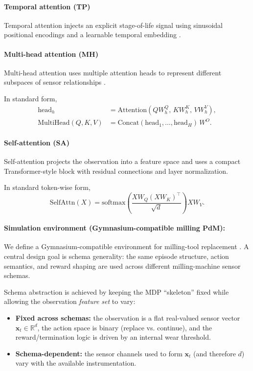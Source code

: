 \documentclass[sn-basic]{sn-jnl} %
\begin{document}
\paragraph{Temporal attention (TP)}
Temporal attention injects an explicit stage-of-life signal using sinusoidal positional encodings and a learnable temporal embedding \cite{Vaswani2017}.

\paragraph{Multi-head attention (MH)}
Multi-head attention uses multiple attention heads to represent different subspaces of sensor relationships \cite{Vaswani2017}.

In standard form,
\begin{align}
\mathrm{head}_h &= \mathrm{Attention}(QW_h^Q,\,KW_h^K,\,VW_h^V),\\
\mathrm{MultiHead}(Q,K,V) &= \mathrm{Concat}(\mathrm{head}_1,\ldots,\mathrm{head}_H)\,W^O.
\end{align}

\paragraph{Self-attention (SA)}
Self-attention projects the observation into a feature space and uses a compact Transformer-style block with residual connections and layer normalization.

In standard token-wise form,
\begin{equation}
\mathrm{SelfAttn}(X)=\mathrm{softmax}\left(\frac{XW_Q(XW_K)^\top}{\sqrt{d}}\right)XW_V.
\end{equation}

\paragraph{Simulation environment (Gymnasium-compatible milling PdM):}
We define a Gymnasium-compatible environment for milling-tool replacement \cite{Foundation2023}. A central design goal is schema generality: the same episode structure, action semantics, and reward shaping are used across different milling-machine sensor schemas.

Schema abstraction is achieved by keeping the MDP ``skeleton'' fixed while allowing the observation \emph{feature set} to vary:
\begin{itemize}
	\item \textbf{Fixed across schemas:} the observation is a flat real-valued sensor vector $\mathbf{x}_t\in\mathbb{R}^d$, the action space is binary (replace vs. continue), and the reward/termination logic is driven by an internal wear threshold.
	\item \textbf{Schema-dependent:} the sensor channels used to form $\mathbf{x}_t$ (and therefore $d$) vary with the available instrumentation.
\end{itemize}
\end{document}
